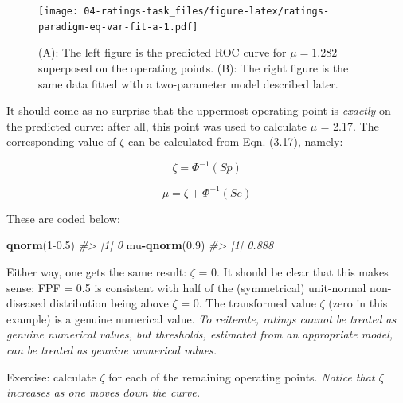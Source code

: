 \documentclass[
]{book}
\newenvironment{Shaded}{\begin{snugshade}}{\end{snugshade}}
\newcommand{\CommentTok}[1]{\textcolor[rgb]{0.56,0.35,0.01}{\textit{#1}}}
\newcommand{\DecValTok}[1]{\textcolor[rgb]{0.00,0.00,0.81}{#1}}
\newcommand{\FloatTok}[1]{\textcolor[rgb]{0.00,0.00,0.81}{#1}}
\newcommand{\KeywordTok}[1]{\textcolor[rgb]{0.13,0.29,0.53}{\textbf{#1}}}
\newcommand{\NormalTok}[1]{#1}
\newcommand{\OperatorTok}[1]{\textcolor[rgb]{0.81,0.36,0.00}{\textbf{#1}}}
\begin{document}
\begin{figure}
\centering
\texttt{[image: 04-ratings-task\_files/figure-latex/ratings-paradigm-eq-var-fit-a-1.pdf]}
\caption{\label{fig:ratings-paradigm-eq-var-fit-a}(A): The left figure is the predicted ROC curve for \(\mu=1.282\) superposed on the operating points. (B): The right figure is the same data fitted with a two-parameter model described later.}
\end{figure}

It should come as no surprise that the uppermost operating point is \emph{exactly} on the predicted curve: after all, this point was used to calculate \(\mu\) = 2.17. The corresponding value of \(\zeta\) can be calculated from Eqn. (3.17), namely:

\begin{equation*} 
\zeta = \Phi^{-1}\left ( Sp \right )
\label{eq:ratings-paradigm-Zeta}
\end{equation*}

\begin{equation*} 
\mu = \zeta + \Phi^{-1}\left ( Se \right )
\label{eq:ratings-paradigm-Mu}
\end{equation*}

These are coded below:

\begin{Shaded}
\begin{Highlighting}[]
\KeywordTok{qnorm}\NormalTok{(}\DecValTok{1}\FloatTok{-0.5}\NormalTok{)}
\CommentTok{#> [1] 0}
\NormalTok{mu}\OperatorTok{-}\KeywordTok{qnorm}\NormalTok{(}\FloatTok{0.9}\NormalTok{)}
\CommentTok{#> [1] 0.888}
\end{Highlighting}
\end{Shaded}

Either way, one gets the same result: \(\zeta\) = 0. It should be clear that this makes sense: FPF = 0.5 is consistent with half of the (symmetrical) unit-normal non-diseased distribution being above \(\zeta\) = 0. The transformed value \(\zeta\) (zero in this example) is a genuine numerical value. \emph{To reiterate, ratings cannot be treated as genuine numerical values, but thresholds, estimated from an appropriate model, can be treated as genuine numerical values.}

Exercise: calculate \(\zeta\) for each of the remaining operating points. \emph{Notice that \(\zeta\) increases as one moves down the curve.}
\end{document}
